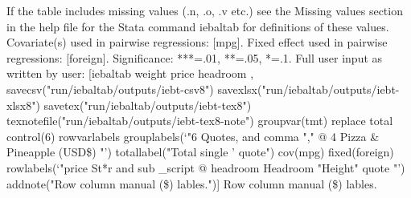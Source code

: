 If the table includes missing values (.n, .o, .v etc.) see the Missing values section in the help file for the Stata command iebaltab for definitions of these values. Covariate(s) used in pairwise regressions: [mpg]. Fixed effect used in pairwise regressions: [foreign]. Significance: ***=.01, **=.05, *=.1. Full user input as written by user: [iebaltab weight price headroom , savecsv("run/iebaltab/outputs/iebt-csv8") savexlsx("run/iebaltab/outputs/iebt-xlsx8") savetex("run/iebaltab/outputs/iebt-tex8") texnotefile("run/iebaltab/outputs/iebt-tex8-note") groupvar(tmt) replace total control(6) rowvarlabels grouplabels(`"6 Quotes, and comma "," @ 4 Pizza \& Pineapple (USD\$) "') totallabel("Total single ' quote") cov(mpg) fixed(foreign) rowlabels(`"price St*r and sub \_script @ headroom Headroom "Height" quote "') addnote("Row column manual (\$) lables.")] Row column manual (\$) lables.
